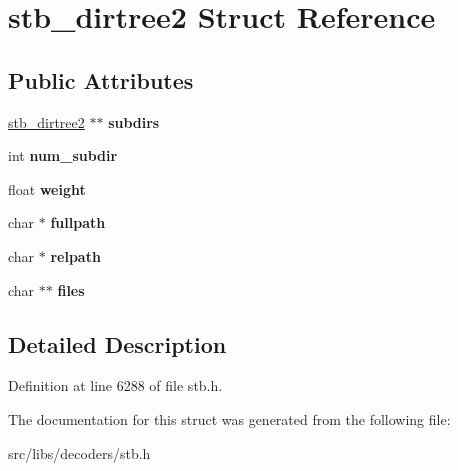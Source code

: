 \hypertarget{structstb__dirtree2}{\section{stb\-\_\-dirtree2 Struct Reference}
\label{structstb__dirtree2}
}
\subsection*{Public Attributes}
\begin{DoxyCompactItemize}
\item 
\hypertarget{structstb__dirtree2_a8a61b220ee15e03c2769c4525bb6c885}{\hyperlink{structstb__dirtree2}{stb\-\_\-dirtree2} $\ast$$\ast$ {\bfseries subdirs}}\label{structstb__dirtree2_a8a61b220ee15e03c2769c4525bb6c885}

\item 
\hypertarget{structstb__dirtree2_ab7ad776f702ca9e8bec2237511c0f1dd}{int {\bfseries num\-\_\-subdir}}\label{structstb__dirtree2_ab7ad776f702ca9e8bec2237511c0f1dd}

\item 
\hypertarget{structstb__dirtree2_ad5892c702bd4eb740110c52a0a348d80}{float {\bfseries weight}}\label{structstb__dirtree2_ad5892c702bd4eb740110c52a0a348d80}

\item 
\hypertarget{structstb__dirtree2_a11618b74091877af08c78ace84cfd47d}{char $\ast$ {\bfseries fullpath}}\label{structstb__dirtree2_a11618b74091877af08c78ace84cfd47d}

\item 
\hypertarget{structstb__dirtree2_ae6b7e592877b5af149d3f373ae5cfac0}{char $\ast$ {\bfseries relpath}}\label{structstb__dirtree2_ae6b7e592877b5af149d3f373ae5cfac0}

\item 
\hypertarget{structstb__dirtree2_a9207bd494bbbec51e52bbce37de24822}{char $\ast$$\ast$ {\bfseries files}}\label{structstb__dirtree2_a9207bd494bbbec51e52bbce37de24822}

\end{DoxyCompactItemize}


\subsection{Detailed Description}


Definition at line 6288 of file stb.\-h.



The documentation for this struct was generated from the following file\-:\begin{DoxyCompactItemize}
\item 
src/libs/decoders/stb.\-h\end{DoxyCompactItemize}
